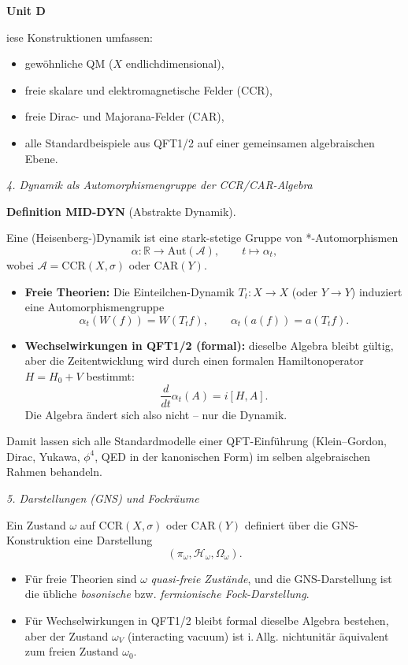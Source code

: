 \documentclass[10pt, letterpaper]{article}
\newcommand{\CustomHeading}[3]{%
  \par\medskip\noindent%
  \textbf{#1 #2} \textnormal{(#3)}.\enskip%
}
\newenvironment{DEF}[2]{\begin{unitbox}\CustomHeading{Definition}{#1}{#2}}{\end{unitbox}}
\newenvironment{unit}[1]
  {\begin{unitbox}\textbf{Unit #1}\par\smallskip}
  {\end{unitbox}}
\begin{document}
\begin{unit}
Diese Konstruktionen umfassen:
\begin{itemize}
  \item gewöhnliche QM (\(X\) endlichdimensional),
  \item freie skalare und elektromagnetische Felder (CCR),
  \item freie Dirac- und Majorana-Felder (CAR),
  \item alle Standardbeispiele aus QFT1/2 auf einer gemeinsamen algebraischen Ebene.
\end{itemize}

\emph{4. Dynamik als Automorphismengruppe der CCR/CAR-Algebra}

\begin{DEF}{MID-DYN}{Abstrakte Dynamik}
Eine (Heisenberg-)Dynamik ist eine stark-stetige Gruppe von *-Automorphismen
\[
\alpha : \mathbb{R} \to \mathrm{Aut}(\mathcal{A}),\qquad
t\mapsto \alpha_t,
\]
wobei \(\mathcal{A}=\mathrm{CCR}(X,\sigma)\) oder \(\mathrm{CAR}(Y)\).
\end{DEF}

\begin{itemize}
  \item \textbf{Freie Theorien:}  
        Die Einteilchen-Dynamik \(T_t:X\to X\) (oder \(Y\to Y\))
        induziert eine Automorphismengruppe
        \[
        \alpha_t(W(f)) = W(T_tf),\qquad
        \alpha_t(a(f)) = a(T_t f).
        \]
  \item \textbf{Wechselwirkungen in QFT1/2 (formal):}  
        dieselbe Algebra bleibt gültig, aber die Zeitentwicklung wird
        durch einen formalen Hamiltonoperator \(H=H_0+V\) bestimmt:
        \[
        \frac{d}{dt}\alpha_t(A)=i[H,A].
        \]
        Die Algebra ändert sich also nicht – nur die Dynamik.
\end{itemize}

Damit lassen sich alle Standardmodelle einer QFT-Einführung
(Klein–Gordon, Dirac, Yukawa, \(\phi^4\), QED in der kanonischen Form)
im selben algebraischen Rahmen behandeln.

\emph{5. Darstellungen (GNS) und Fockräume}

Ein Zustand \(\omega\) auf \(\mathrm{CCR}(X,\sigma)\) oder \(\mathrm{CAR}(Y)\)
definiert über die GNS-Konstruktion eine Darstellung
\[
(\pi_\omega,\mathcal{H}_\omega,\Omega_\omega).
\]

\begin{itemize}
  \item Für freie Theorien sind \(\omega\) \emph{quasi-freie Zustände},
        und die GNS-Darstellung ist die übliche \emph{bosonische} bzw.
        \emph{fermionische Fock-Darstellung}.
  \item Für Wechselwirkungen in QFT1/2 bleibt formal dieselbe Algebra bestehen,
        aber der Zustand \(\omega_V\) (interacting vacuum) ist i.\,Allg.
        nichtunitär äquivalent zum freien Zustand \(\omega_0\).
\end{itemize}


\end{unit}
\end{document}
